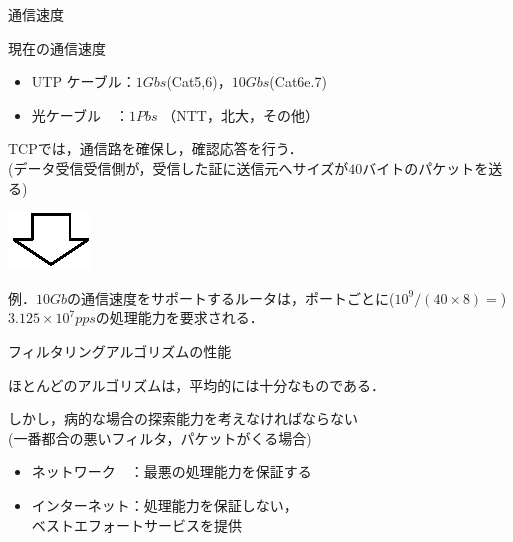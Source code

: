 \documentclass[12pt,dvipdfmx,mathserif,uplatex,aspectratio=32]{beamer}
\begin{document}
\begin{frame}{通信速度}

現在の通信速度 \\ \vspace{2mm}
\begin{itemize}
 \item UTP ケーブル：$1Gbs$(Cat5,6)，$10Gbs$(Cat6e.7)
 \item 光ケーブル　：$1Pbs$ （NTT，北大，その他）
\end{itemize}

\vspace{3mm}

TCPでは，通信路を確保し，確認応答を行う．\\
(データ受信受信側が，受信した証に送信元へサイズが$40$バイトのパケットを送る) \\

{\centering
\includegraphics{downarrow.eps}

}

例．$10Gb$の通信速度をサポートするルータは，ポートごとに($10^{9}/(40\times8) =$) $3.125 \times 10^{7}pps$の処理能力を要求される．

\end{frame}


\begin{frame}{フィルタリングアルゴリズムの性能}

ほとんどのアルゴリズムは，平均的には十分なものである．\\
\vspace{10mm}

しかし，病的な場合の探索能力を考えなければならない\\
(一番都合の悪いフィルタ，パケットがくる場合)

\vspace{10mm}
\begin{itemize}
 \item ネットワーク　：最悪の処理能力を保証する
 \item インターネット：処理能力を保証しない，\\ \hspace{32.3mm}ベストエフォートサービスを提供
\end{itemize}

\end{frame}
\end{document}
